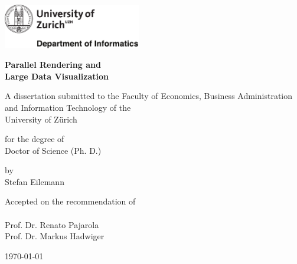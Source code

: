 

\begin{titlepage}

\setlength{\parindent}{0pt} %

\includegraphics[width=6cm]{front/images/uzhlogo.pdf}

\vspace{-2.25cm}

\begingroup
{}

\vspace{-0.75cm}
\Large
\textbf{Parallel Rendering and\\Large Data Visualization}

\vspace{0.70cm}

\normalsize
A dissertation submitted to the Faculty of Economics,
Business Administration and Information Technology of the\\ University of Z\"urich\\

\vspace{0.70cm}

for the degree of\\
Doctor of Science (Ph. D.)

\vspace{0.70cm}

by\\
Stefan Eilemann

\vspace{3.7cm}

Accepted on the recommendation of \\
\\
Prof. Dr. Renato Pajarola\\
Prof. Dr. Markus Hadwiger

\vspace{2.2cm}
\today

\vspace{2.2cm}

\endgroup

\end{titlepage}
